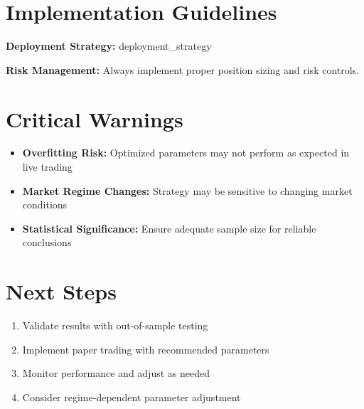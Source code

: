 \documentclass[11pt,a4paper]{article}
\begin{document}
\section{Implementation Guidelines}
\textbf{Deployment Strategy:} {{deployment_strategy}}

\textbf{Risk Management:} Always implement proper position sizing and risk controls.

\section{Critical Warnings}
\begin{itemize}
\item \textcolor{warning}{\textbf{Overfitting Risk:}} Optimized parameters may not perform as expected in live trading
\item \textcolor{warning}{\textbf{Market Regime Changes:}} Strategy may be sensitive to changing market conditions
\item \textcolor{warning}{\textbf{Statistical Significance:}} Ensure adequate sample size for reliable conclusions
\end{itemize}

\section{Next Steps}
\begin{enumerate}
\item Validate results with out-of-sample testing
\item Implement paper trading with recommended parameters
\item Monitor performance and adjust as needed
\item Consider regime-dependent parameter adjustment
\end{enumerate}
\end{document}
